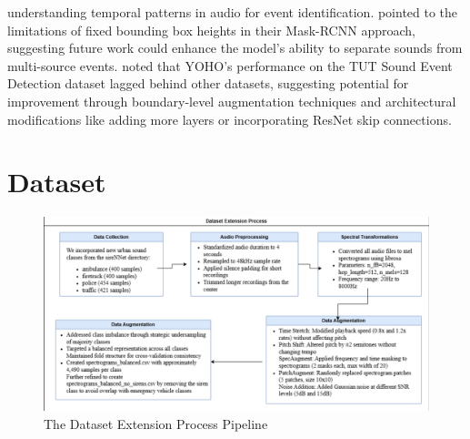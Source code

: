 \documentclass[11pt]{article}
\begin{document}
understanding temporal patterns in audio for event identification. \citep{8995448} pointed to the limitations of fixed bounding box heights in their Mask-RCNN approach, suggesting future work could enhance the model's ability to separate sounds from multi-source events. \citep{Venkatesh_2022} noted that YOHO's performance on the TUT Sound Event Detection dataset lagged behind other datasets, suggesting potential for improvement through boundary-level augmentation techniques and architectural modifications like adding more layers or incorporating ResNet skip connections.
\section{Dataset}
\begin{figure}
  \centering
  \includegraphics[width=\textwidth]{latex//assets/dataset_extension_process.PNG}
  \caption{The Dataset Extension Process Pipeline}
  
\end{figure}
\end{document}
